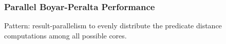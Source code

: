 \documentclass[handout,10pt]{beamer}
\begin{document}
\begin{frame}
	\frametitle{Parallel Boyar-Peralta Performance}
Pattern: result-parallelism to evenly distribute the predicate distance computations among all possible cores.

\begin{figure}
\centering     %
{}
\end{figure}


\end{frame}
\end{document}
